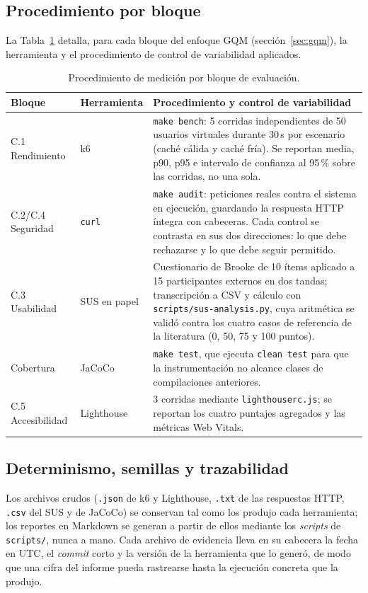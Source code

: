 \documentclass[11pt,a4paper]{article}
\newcommand{\ruta}[1]{\texttt{\footnotesize #1}}
\begin{document}
\subsection{Procedimiento por bloque}

La Tabla~\ref{tab:procedimiento-bloque} detalla, para cada bloque del
enfoque GQM (sección~\ref{sec:gqm}), la herramienta y el procedimiento
de control de variabilidad aplicados.

\begin{table}[htbp]
\centering
\caption{Procedimiento de medición por bloque de evaluación.}
\label{tab:procedimiento-bloque}
\begin{tabular}{@{}llp{6.1cm}@{}}
\toprule
\textbf{Bloque} & \textbf{Herramienta} & \textbf{Procedimiento y control de variabilidad} \\
\midrule
C.1 Rendimiento & k6 & \texttt{make bench}: 5 corridas independientes de 50 usuarios virtuales durante 30\,s por escenario (caché cálida y caché fría). Se reportan media, p90, p95 e intervalo de confianza al 95\,\% sobre las corridas, no una sola. \\
C.2/C.4 Seguridad & \texttt{curl} & \texttt{make audit}: peticiones reales contra el sistema en ejecución, guardando la respuesta HTTP íntegra con cabeceras. Cada control se contrasta en sus dos direcciones: lo que debe rechazarse y lo que debe seguir permitido. \\
C.3 Usabilidad & SUS en papel & Cuestionario de Brooke de 10 ítems aplicado a 15 participantes externos en dos tandas; transcripción a CSV y cálculo con \ruta{scripts/sus-analysis.py}, cuya aritmética se validó contra los cuatro casos de referencia de la literatura (0, 50, 75 y 100 puntos). \\
Cobertura & JaCoCo & \texttt{make test}, que ejecuta \texttt{clean test} para que la instrumentación no alcance clases de compilaciones anteriores. \\
C.5 Accesibilidad & Lighthouse & 3 corridas mediante \ruta{lighthouserc.js}; se reportan los cuatro puntajes agregados y las métricas Web Vitals. \\
\bottomrule
\end{tabular}
\end{table}

\subsection{Determinismo, semillas y trazabilidad}

Los archivos crudos (\texttt{.json} de k6 y Lighthouse, \texttt{.txt} de las
respuestas HTTP, \texttt{.csv} del SUS y de JaCoCo) se conservan tal como los
produjo cada herramienta; los reportes en Markdown se generan a partir de
ellos mediante los \emph{scripts} de \ruta{scripts/}, nunca a mano. Cada
archivo de evidencia lleva en su cabecera la fecha en UTC, el \emph{commit}
corto y la versión de la herramienta que lo generó, de modo que una cifra del
informe pueda rastrearse hasta la ejecución concreta que la produjo.
\end{document}
